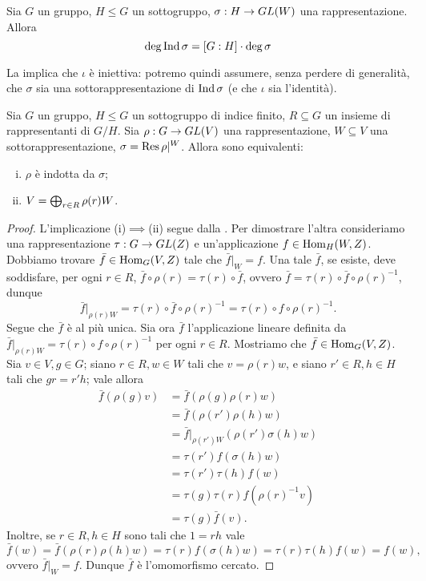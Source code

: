 \begin{corollary}
Sia $G$ un gruppo, $H\le G$ un sottogruppo, $\sigma:H\to GL(W)$ una rappresentazione. Allora
$$
\deg\operatorname{Ind}\sigma=[G:H]\cdot\deg\sigma
$$
\end{corollary}

La  implica che $\iota$ è iniettiva: potremo quindi assumere, senza perdere di generalità, che $\sigma$ sia una sottorappresentazione di $\operatorname{Ind}\sigma$ (e che $\iota$ sia l'identità).

\begin{proposition}
Sia $G$ un gruppo, $H\le G$ un sottogruppo di indice finito, $R\subseteq G$ un insieme di rappresentanti di $G/H$. Sia $\rho:G\to GL(V)$ una rappresentazione, $W\subseteq V$ una sottorappresentazione, $\sigma=\operatorname{Res}\rho|^W$. Allora sono equivalenti:
\begin{enumerate}[(i)]
\item $\rho$ è indotta da $\sigma$;
\item $V=\bigoplus_{r\in R}\rho(r)W$.
\end{enumerate}
\end{proposition}
\begin{proof}
L'implicazione (i)$\implies$(ii) segue dalla . Per dimostrare l'altra consideriamo una rappresentazione $\tau:G\to GL(Z)$ e un'applicazione $f\in\operatorname{Hom}_H(W,Z)$. Dobbiamo trovare $\bar{f}\in\operatorname{Hom}_G(V,Z)$ tale che $\bar{f}|_W=f$. Una tale $\bar{f}$, se esiste, deve soddisfare, per ogni $r\in R$, $\bar{f}\circ\rho(r)=\tau(r)\circ\bar{f}$, ovvero $\bar{f}=\tau(r)\circ\bar{f}\circ\rho(r)^{-1}$, dunque 
$$
\bar{f}|_{\rho(r)W}=\tau(r)\circ\bar{f}\circ\rho(r)^{-1}=\tau(r)\circ f\circ\rho(r)^{-1}.
$$
Segue che $\bar{f}$ è al più unica. Sia ora $\bar{f}$ l'applicazione lineare definita da $\bar{f}|_{\rho(r)W}=\tau(r)\circ f\circ\rho(r)^{-1}$ per ogni $r\in R$. Mostriamo che $\bar{f}\in\operatorname{Hom}_G(V,Z)$. Sia $v\in V\comma g\in G$; siano $r\in R\comma w\in W$ tali che $v=\rho(r)w$, e siano $r'\in R\comma h\in H$ tali che $gr=r'h$; vale allora
\begin{align*}
\bar{f}(\rho(g)v)&=\bar{f}(\rho(g)\rho(r)w)\\
&=\bar{f}(\rho(r')\rho(h)w)\\
&=\bar{f}|_{\rho(r')W}(\rho(r')\sigma(h)w)\\
&=\tau(r')f(\sigma(h)w)\\
&=\tau(r')\tau(h)f(w)\\
&=\tau(g)\tau(r)f(\rho(r)^{-1}v)\\
&=\tau(g)\bar{f}(v).
\end{align*}
Inoltre, se $r\in R\comma h\in H$ sono tali che $1=rh$ vale
$$
\bar{f}(w)=\bar{f}(\rho(r)\rho(h)w)=\tau(r)f(\sigma(h)w)=\tau(r)\tau(h)f(w)=f(w),
$$
ovvero $\bar{f}|_W=f$. Dunque $\bar{f}$ è l'omomorfismo cercato.
\end{proof}

